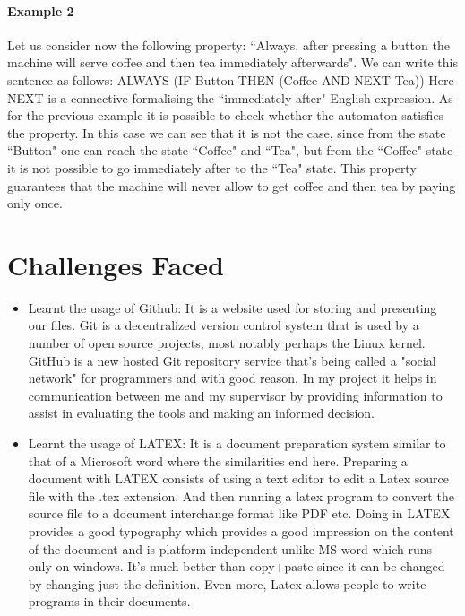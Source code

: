 \documentclass[a4paper,12pt]{extarticle}
\begin{document}
\paragraph{Example 2}
Let us consider now the following property: ``Always, after pressing a button the machine will serve coffee and then tea immediately afterwards". We can write this sentence as follows:
ALWAYS (IF Button THEN (Coffee AND NEXT Tea))
Here NEXT is a connective formalising the ``immediately after" English expression. As for the previous example it is possible to check whether the automaton satisfies the property. In this case we can see that it is not the case, since from the state ``Button" one can reach the state ``Coffee" and ``Tea", but from the ``Coffee" state it is not possible to go immediately after to the ``Tea" state. This property guarantees that the machine will never allow to get coffee and then tea by paying only once.
\section{Challenges Faced}
\label{challenge face}
\begin{itemize}
\item Learnt the usage of Github: It is a website used for storing and presenting our files. Git is a decentralized version control system that is used by a number of open source projects, most notably perhaps the Linux kernel. GitHub is a new hosted Git repository service that's being called a "social network" for programmers and with good reason. In my project it helps in communication between me and my supervisor by providing information to assist in evaluating the tools and making an informed decision.
\item Learnt the usage of LATEX: It is a document preparation system similar to that of a Microsoft word where the similarities end here. Preparing a document with LATEX consists of using a text editor to edit a Latex source file with the .tex extension. And then running a latex program to convert the source file to a document interchange format like PDF etc. Doing in LATEX provides a good typography which provides a good impression on the content of the document and is platform independent unlike MS word which runs only on windows. It's much better than copy+paste since it can be changed by changing just the definition. Even more, Latex allows people to write programs in their documents. 
\end{itemize}
\end{document}
